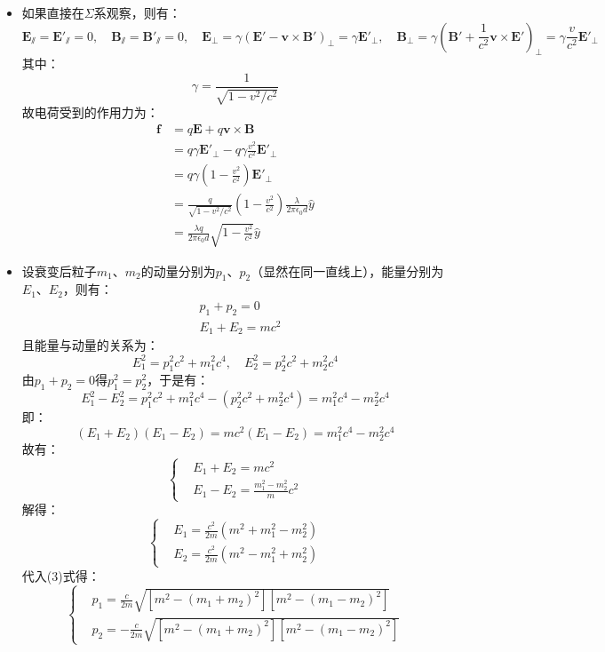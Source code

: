 \documentclass[a4paper,fontset=none]{ctexart}
\begin{document}
\begin{itemize}
    \item[16.(b)]
    如果直接在$\varSigma$系观察，则有：
    \[
        \bm{E}_\varparallel = \bm{E}'_\varparallel = 0,\quad
        \bm{B}_\varparallel = \bm{B}'_\varparallel = 0,\quad
        \bm{E}_\perp = \gamma(\bm{E}' - \bm{v}\times\bm{B}')_\perp = \gamma\bm{E}'_\perp,\quad
        \bm{B}_\perp = \gamma(\bm{B}' + \frac{1}{c^2}\bm{v}\times\bm{E}')_\perp = \gamma\frac{v}{c^2}\bm{E}'_\perp
    \]
    其中：
    \[
        \gamma = \frac{1}{\sqrt{1-v^2/c^2}}
    \]
    故电荷受到的作用力为：
    \begin{align*}
        \bm{f}
        &= q\bm{E} + q\bm{v} \times \bm{B} \\
        &= q\gamma\bm{E}'_\perp - q\gamma\frac{v^2}{c^2}\bm{E}'_\perp \\
        &= q\gamma\left(1 - \frac{v^2}{c^2}\right)\bm{E}'_\perp \\
        &= \frac{q}{\sqrt{1-v^2/c^2}}\left(1 - \frac{v^2}{c^2}\right)\frac{\lambda}{2\pi\epsilon_0d}\hat{y} \\
        &= \frac{\lambda q}{2\pi\epsilon_0d}\sqrt{1 - \frac{v^2}{c^2}}\hat{y}
    \end{align*}

    \item[17.]
    \setcounter{equation}{0}
    设衰变后粒子$m_1$、$m_2$的动量分别为$p_1$、$p_2$（显然在同一直线上），能量分别为$E_1$、$E_2$，则有：
    \begin{align}
        &p_1 + p_2 = 0 \\
        &E_1 + E_2 = mc^2
    \end{align}
    且能量与动量的关系为：
    \begin{equation}
        E_1^2 = p_1^2c^2 + m_1^2c^4,\quad E_2^2 = p_2^2c^2 + m_2^2c^4
    \end{equation}
    由$p_1+p_2=0$得$p_1^2=p_2^2$，于是有：
    \[
        E_1^2 - E_2^2 = p_1^2c^2 + m_1^2c^4 - (p_2^2c^2 + m_2^2c^4) = m_1^2c^4 - m_2^2c^4
    \]
    即：
    \[
        (E_1 + E_2)(E_1 - E_2) = mc^2(E_1 - E_2) = m_1^2c^4 - m_2^2c^4
    \]
    故有：
    \[
    \left\{
        \begin{aligned}
            &E_1 + E_2 = mc^2 \\
            &E_1 - E_2 = \frac{m_1^2 - m_2^2}{m}c^2
        \end{aligned}
    \right.
    \]
    解得：
    \[
        \left\{
        \begin{aligned}
            &E_1 = \frac{c^2}{2m}(m^2 + m_1^2 - m_2^2) \\
            &E_2 = \frac{c^2}{2m}(m^2 - m_1^2 + m_2^2)
        \end{aligned}
    \right.
    \]
    代入(3)式得：
    \[
        \left\{
        \begin{aligned}
            &p_1 = \frac{c}{2m}\sqrt{\left[m^2 - (m_1 + m_2)^2\right] \left[m^2 - (m_1 - m_2)^2\right]} \\
            &p_2 = -\frac{c}{2m}\sqrt{\left[m^2 - (m_1 + m_2)^2\right] \left[m^2 - (m_1 - m_2)^2\right]}
        \end{aligned}
    \right.
    \]


\end{itemize}
\end{document}

